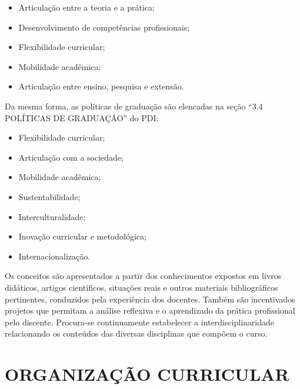 \begin{itemize}
	\item Articulação entre a teoria e a prática;
	\item Desenvolvimento de competências profissionais;
	\item Flexibilidade curricular;
	\item Mobilidade acadêmica;
	\item Articulação entre ensino, pesquisa e extensão.
\end{itemize}

Da mesma forma, as políticas de graduação são elencadas na seção ``3.4 POLÍTICAS DE GRADUAÇÃO'' do PDI:

\begin{itemize}
	\item Flexibilidade curricular;
	\item Articulação com a sociedade;
	\item Mobilidade acadêmica;
	\item Sustentabilidade;
	\item Interculturalidade;
	\item Inovação curricular e metodológica;
	\item Internacionalização.
\end{itemize}


Os conceitos são apresentados a partir dos conhecimentos expostos em livros didáticos, artigos científicos, situações reais e outros materiais bibliográficos pertinentes, conduzidos pela experiência dos docentes. Também são incentivados projetos que permitam a análise reflexiva e o aprendizado da prática profissional pelo discente. Procura-se continuamente estabelecer a interdisciplinaridade relacionando os conteúdos das diversas disciplinas que compõem o curso.

\section{ORGANIZAÇÃO CURRICULAR}

